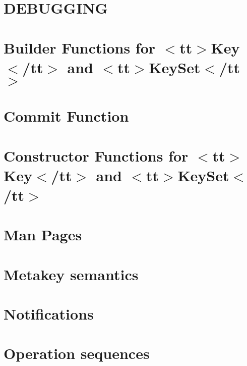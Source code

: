\let\mypdfximage\pdfximage\def\pdfximage{\immediate\mypdfximage}\documentclass[twoside]{book}
\newcommand{\+}{\discretionary{\mbox{\scriptsize$\hookleftarrow$}}{}{}}
\begin{document}
\chapter{DEBUGGING}
\label{doc_DEBUGGING_md}

\chapter{Builder Functions for $<$tt$>$Key$<$/tt$>$ and $<$tt$>$Key\+Set$<$/tt$>$}
\label{doc_decisions_0_drafts_builder_functions_md}

\chapter{Commit Function}
\label{doc_decisions_0_drafts_commit_function_md}

\chapter{Constructor Functions for $<$tt$>$Key$<$/tt$>$ and $<$tt$>$Key\+Set$<$/tt$>$}
\label{doc_decisions_0_drafts_constructor_functions_md}

\chapter{Man Pages}
\label{doc_decisions_0_drafts_man_pages_md}

\chapter{Metakey semantics}
\label{doc_decisions_0_drafts_metakey_semantics_md}

\chapter{Notifications}
\label{doc_decisions_0_drafts_notifications_md}

\chapter{Operation sequences}
\label{doc_decisions_0_drafts_operation_sequences_md}

\end{document}
